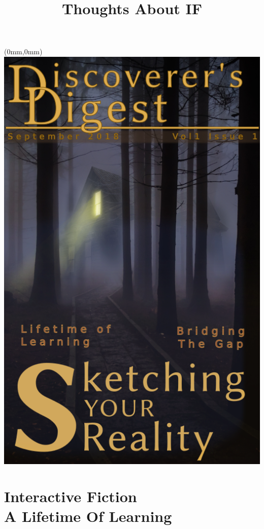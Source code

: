 \documentclass[10pt,openany,final]{memoir}
\title{Thoughts About IF}
\begin{document}

\chapter*{}

\begin{textblock*}{70.9mm}(0mm,0mm)
\includegraphics[width=\paperwidth]{./media/images/cover.png}
\end{textblock*}
\newpage
\tableofcontents*
\newpage
\chapter{Interactive Fiction \\ \small{A Lifetime Of Learning}}

\end{document}
